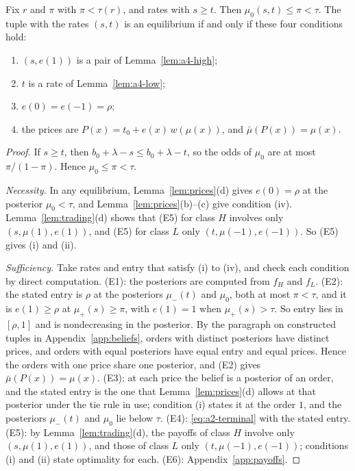 \begin{lemma}\label{lem:a4-product}
Fix \(r\) and \(\pi\) with \(\pi<\tau(r)\), and rates with \(s\ge t\). Then \(\mu_0(s,t)\le\pi<\tau\). The tuple with
the rates \((s,t)\) is an equilibrium if and only if these four conditions hold:
\begin{enumerate}[label=(\roman*),leftmargin=2.5em]
\item \((s,e(1))\) is a pair of Lemma~\ref{lem:a4-high};
\item \(t\) is a rate of Lemma~\ref{lem:a4-low};
\item \(e(0)=e(-1)=\rho\);
\item the prices are \(P(x)=t_0+e(x)\,w(\mu(x))\), and \(\bar\mu(P(x))=\mu(x)\).
\end{enumerate}
\end{lemma}

\begin{proof}
If \(s\ge t\), then \(b_0+\lambda-s\le b_0+\lambda-t\), so the odds of \(\mu_0\) are at most \(\pi/(1-\pi)\). Hence
\(\mu_0\le\pi<\tau\).

\emph{Necessity.} In any equilibrium, Lemma~\ref{lem:prices}(d) gives \(e(0)=\rho\) at the posterior \(\mu_0<\tau\),
and Lemma~\ref{lem:prices}(b)--(c) give condition (iv). Lemma~\ref{lem:trading}(d) shows that (E5) for class \(H\)
involves only \((s,\mu(1),e(1))\), and (E5) for class \(L\) only \((t,\mu(-1),e(-1))\). So (E5) gives (i) and
(ii).

\emph{Sufficiency.} Take rates and entry that satisfy (i) to (iv), and check each condition by direct computation.
(E1): the posteriors are computed from \(f_H\) and \(f_L\). (E2): the stated entry is \(\rho\) at the posteriors
\(\mu_-(t)\) and \(\mu_0\), both at most \(\pi<\tau\), and it is \(e(1)\ge\rho\) at \(\mu_+(s)\ge\pi\), with
\(e(1)=1\) when \(\mu_+(s)>\tau\). So entry lies in \([\rho,1]\) and is nondecreasing in the posterior. By the
paragraph on constructed tuples in Appendix~\ref{app:beliefs}, orders with distinct posteriors have distinct
prices, and orders with equal posteriors have equal entry and equal prices. Hence the orders with one price share
one posterior, and (E2) gives \(\bar\mu(P(x))=\mu(x)\). (E3): at each price the belief is a posterior of an order,
and the stated entry is the one that Lemma~\ref{lem:prices}(d) allows at that posterior under the tie rule in use;
condition (i) states it at the order \(1\), and the posteriors \(\mu_-(t)\) and \(\mu_0\) lie below \(\tau\). (E4):
\eqref{eq:a2-terminal} with the stated entry. (E5): by Lemma~\ref{lem:trading}(d), the payoffs of class \(H\)
involve only \((s,\mu(1),e(1))\), and those of class \(L\) only \((t,\mu(-1),e(-1))\); conditions (i) and (ii) state
optimality for each. (E6): Appendix~\ref{app:payoffs}.
\end{proof}

